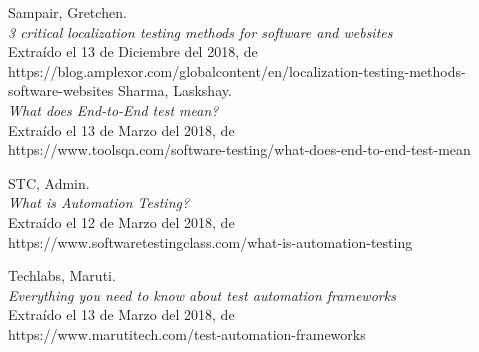 \begin{thebibliography}{99}
 Sampair, Gretchen.\\
\emph{3 critical localization testing methods for software and websites}\\
Extraído el 13 de Diciembre del 2018, de\\
https://blog.amplexor.com/globalcontent/en/localization-testing-methods-software-websites
 Sharma, Laskshay.\\
\emph{What does End-to-End test mean?}\\
Extraído el 13 de Marzo del 2018, de\\
https://www.toolsqa.com/software-testing/what-does-end-to-end-test-mean

 STC, Admin.\\
\emph{What is Automation Testing?}\\
Extraído el 12 de Marzo del 2018, de\\
https://www.softwaretestingclass.com/what-is-automation-testing

 Techlabs, Maruti.\\
\emph{Everything you need to know about test automation frameworks}\\
Extraído el 13 de Marzo del 2018, de\\
https://www.marutitech.com/test-automation-frameworks

\end{thebibliography}

